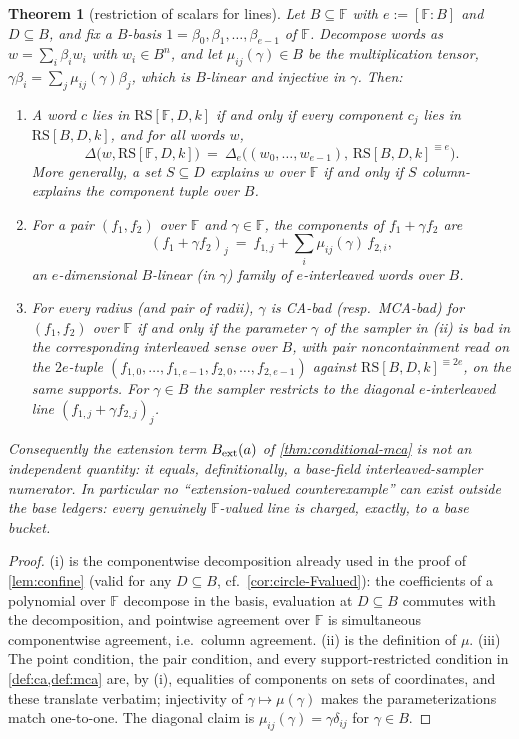 \documentclass[11pt]{article}
\newtheorem{theorem}{Theorem}[section]
\theoremstyle{definition}
\theoremstyle{remark}
\newcommand{\F}{\mathbb{F}}
\newcommand{\B}{B}
\newcommand{\RS}{\mathrm{RS}}
\newcommand{\dist}{\Delta}
\begin{document}
\begin{theorem}[restriction of scalars for lines]\label{thm:weil-lines}
Let $\B\subseteq\F$ with $e:=[\F:\B]$ and $D\subseteq\B$, and fix a $\B$-basis $1=\beta_0,\beta_1,\dots,\beta_{e-1}$ of $\F$. Decompose words as $w=\sum_i\beta_iw_i$ with $w_i\in\B^n$, and let $\mu_{ij}(\gamma)\in\B$ be the multiplication tensor, $\gamma\beta_i=\sum_j\mu_{ij}(\gamma)\beta_j$, which is $\B$-linear and injective in $\gamma$. Then:
\begin{enumerate}[label=\textup{(\roman*)}]
\item A word $c$ lies in $\RS[\F,D,k]$ if and only if every component $c_j$ lies in $\RS[\B,D,k]$, and for all words $w$,
\[
\dist\bigl(w,\RS[\F,D,k]\bigr)\ =\ \dist_e\bigl((w_0,\dots,w_{e-1}),\,\RS[\B,D,k]^{\equiv e}\bigr).
\]
More generally, a set $S\subseteq D$ explains $w$ over $\F$ if and only if $S$ column-explains the component tuple over $\B$.
\item For a pair $(f_1,f_2)$ over $\F$ and $\gamma\in\F$, the components of $f_1+\gamma f_2$ are
\[
(f_1+\gamma f_2)_j\ =\ f_{1,j}+\sum_{i}\mu_{ij}(\gamma)\,f_{2,i},
\]
an $e$-dimensional $\B$-linear \textup(in $\gamma$\textup) family of $e$-interleaved words over $\B$.
\item For every radius \textup(and pair of radii\textup), $\gamma$ is CA-bad \textup(resp.\ MCA-bad\textup) for $(f_1,f_2)$ over $\F$ if and only if the parameter $\gamma$ of the sampler in \textup{(ii)} is bad in the corresponding interleaved sense over $\B$, with pair noncontainment read on the $2e$-tuple $(f_{1,0},\dots,f_{1,e-1},f_{2,0},\dots,f_{2,e-1})$ against $\RS[\B,D,k]^{\equiv2e}$, on the same supports. For $\gamma\in\B$ the sampler restricts to the diagonal $e$-interleaved line $(f_{1,j}+\gamma f_{2,j})_j$.
\end{enumerate}
Consequently the extension term $B_{\rm ext}(a)$ of \cref{thm:conditional-mca} is not an independent quantity: it equals, definitionally, a base-field interleaved-sampler numerator. In particular no ``extension-valued counterexample'' can exist outside the base ledgers: every genuinely $\F$-valued line is charged, exactly, to a base bucket.
\end{theorem}

\begin{proof}
(i) is the componentwise decomposition already used in the proof of \cref{lem:confine} \textup(valid for any $D\subseteq\B$, cf.\ \cref{cor:circle-Fvalued}\textup): the coefficients of a polynomial over $\F$ decompose in the basis, evaluation at $D\subseteq\B$ commutes with the decomposition, and pointwise agreement over $\F$ is simultaneous componentwise agreement, i.e.\ column agreement. (ii) is the definition of $\mu$. (iii) The point condition, the pair condition, and every support-restricted condition in \cref{def:ca,def:mca} are, by (i), equalities of components on sets of coordinates, and these translate verbatim; injectivity of $\gamma\mapsto\mu(\gamma)$ makes the parameterizations match one-to-one. The diagonal claim is $\mu_{ij}(\gamma)=\gamma\delta_{ij}$ for $\gamma\in\B$.
\end{proof}
\end{document}
